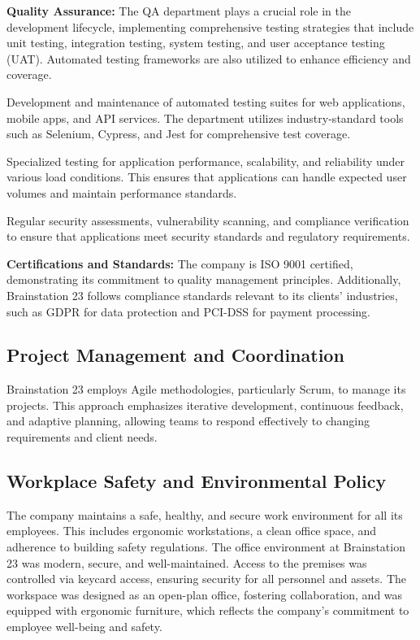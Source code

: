 \documentclass[12pt,a4paper]{article}
\begin{document}
\textbf{Quality Assurance:} The QA department plays a crucial role in the development lifecycle, implementing comprehensive testing strategies that include unit testing, integration testing, system testing, and user acceptance testing (UAT). Automated testing frameworks are also utilized to enhance efficiency and coverage.

Development and maintenance of automated testing suites for web applications, mobile apps, and API services. The department utilizes industry-standard tools such as Selenium, Cypress, and Jest for comprehensive test coverage.

Specialized testing for application performance, scalability, and reliability under various load conditions. This ensures that applications can handle expected user volumes and maintain performance standards.

Regular security assessments, vulnerability scanning, and compliance verification to ensure that applications meet security standards and regulatory requirements.

\textbf{Certifications and Standards:} The company is ISO 9001 certified, demonstrating its commitment to quality management principles. Additionally, Brainstation 23 follows compliance standards relevant to its clients' industries, such as GDPR for data protection and PCI-DSS for payment processing.

\subsection{Project Management and Coordination}
Brainstation 23 employs Agile methodologies, particularly Scrum, to manage its projects. This approach emphasizes iterative development, continuous feedback, and adaptive planning, allowing teams to respond effectively to changing requirements and client needs.

\subsection{Workplace Safety and Environmental Policy}
The company maintains a safe, healthy, and secure work environment for all its employees. This includes ergonomic workstations, a clean office space, and adherence to building safety regulations. The office environment at Brainstation 23 was modern, secure, and well-maintained. Access to the premises was controlled via keycard access, ensuring security for all personnel and assets. The workspace was designed as an open-plan office, fostering collaboration, and was equipped with ergonomic furniture, which reflects the company's commitment to employee well-being and safety.
\end{document}
